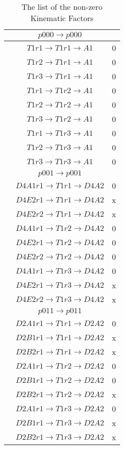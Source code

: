 \documentclass[10pt]{article}
\begin{document}
\begin{table}[!htbp]
\caption {The list of the non-zero Kinematic Factors}
\begin{minipage}{0.33\textwidth}
\raggedright
\begin{tabular}{cc c}
 &$p000 \rightarrow p000 $&\\ \hline
 
 & $T1 r1 \rightarrow T1 r1 \rightarrow A1$ & 0 \\
 & $T1 r2 \rightarrow T1 r1 \rightarrow A1$ &  0\\
 & $T1 r3 \rightarrow T1 r1 \rightarrow A1$ &  0\\
 & $T1 r1 \rightarrow T1 r2 \rightarrow A1$ &  0\\
 & $T1 r2 \rightarrow T1 r2 \rightarrow A1$ &  0\\
 & $T1 r3 \rightarrow T1 r2 \rightarrow A1$ &  0\\
 & $T1 r1 \rightarrow T1 r3 \rightarrow A1$ &  0\\
 & $T1 r2 \rightarrow T1 r3 \rightarrow A1$ &  0\\
 & $T1 r3 \rightarrow T1 r3 \rightarrow A1$ &  0\\

\hline

 &$p001 \rightarrow p001 $&\\ \hline

 & $D4A1 r1 \rightarrow T1 r1 \rightarrow D4A2$ & 0\\
 & $D4E2 r1 \rightarrow T1 r1 \rightarrow D4A2$ & x\\
 & $D4E2 r2 \rightarrow T1 r1 \rightarrow D4A2$ & x\\
 & $D4A1 r1 \rightarrow T1 r2 \rightarrow D4A2$ & 0\\
 & $D4E2 r1 \rightarrow T1 r2 \rightarrow D4A2$ & 0\\
 & $D4E2 r2 \rightarrow T1 r2 \rightarrow D4A2$ & 0\\
 & $D4A1 r1 \rightarrow T1 r3 \rightarrow D4A2$ & 0\\
 & $D4E2 r1 \rightarrow T1 r3 \rightarrow D4A2$ & x\\
 & $D4E2 r2 \rightarrow T1 r3 \rightarrow D4A2$ & x\\

\hline

 &$p011 \rightarrow p011 $& \\ \hline
 & $D2A1 r1 \rightarrow T1 r1 \rightarrow D2A2$ & 0\\
 & $D2B1 r1 \rightarrow T1 r1 \rightarrow D2A2$ &  x\\
 & $D2B2 r1 \rightarrow T1 r1 \rightarrow D2A2$ &  x\\
 & $D2A1 r1 \rightarrow T1 r2 \rightarrow D2A2$ &  0\\
 & $D2B1 r1 \rightarrow T1 r2 \rightarrow D2A2$ &  0\\
 & $D2B2 r1 \rightarrow T1 r2 \rightarrow D2A2$ &  x\\
 & $D2A1 r1 \rightarrow T1 r3 \rightarrow D2A2$ &  0\\
 & $D2B1 r1 \rightarrow T1 r3 \rightarrow D2A2$ &  x\\
 & $D2B2 r1 \rightarrow T1 r3 \rightarrow D2A2$ &  x\\


\end{tabular}
\end{minipage}
\end{table}
\end{document}
